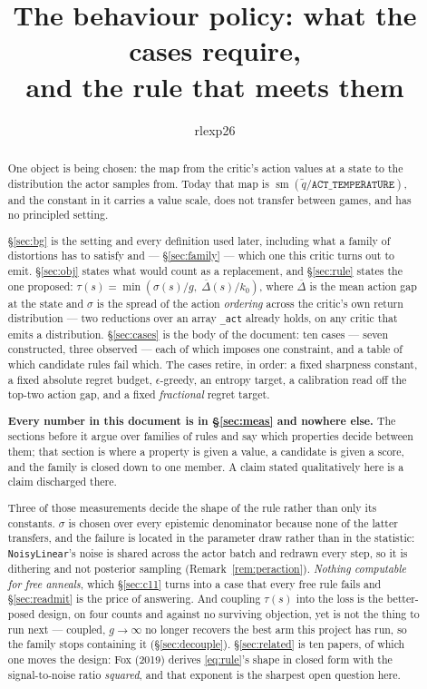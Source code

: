\documentclass{article}
\title{The behaviour policy: what the cases require,\\and the rule that meets them}
\author{rlexp26}
\DeclareMathOperator{\sm}{sm}
\newcommand{\gapbar}{\overline{\Delta}}
\newcommand{\srank}{\sigma}
\begin{document}
\maketitle


\begin{abstract}
One object is being chosen: the map from the critic's action values at a state to the
distribution the actor samples from. Today that map is
$\sm(\tilde{q}/\texttt{ACT\_TEMPERATURE})$, and the constant in it carries a value scale, does
not transfer between games, and has no principled setting.

\S\ref{sec:bg} is the setting and every definition used later, including what a family of
distortions has to satisfy and --- \S\ref{sec:family} --- which one this critic turns out to
emit. \S\ref{sec:obj} states what would count as a replacement, and \S\ref{sec:rule} states the
one proposed: $\tau(s) = \min(\srank(s)/g,\; \gapbar(s)/k_0)$, where $\gapbar$ is the mean action
gap at the state and $\srank$ is the spread of the action \emph{ordering} across the critic's own
return distribution --- two reductions over an array \texttt{\_act} already holds, on any critic
that emits a distribution. \S\ref{sec:cases} is the body of the document: ten cases --- seven
constructed, three observed --- each of which imposes one constraint, and a table of which
candidate rules fail which. The cases retire, in order: a fixed sharpness constant, a fixed
absolute regret budget, $\epsilon$-greedy, an entropy target, a calibration read off the top-two
action gap, and a fixed \emph{fractional} regret target.

\textbf{Every number in this document is in \S\ref{sec:meas} and nowhere else.} The sections
before it argue over families of rules and say which properties decide between them; that section
is where a property is given a value, a candidate is given a score, and the family is closed down
to one member. A claim stated qualitatively here is a claim discharged there.

Three of those measurements decide the shape of the rule rather than only its constants.
$\srank$ is chosen over every epistemic denominator because none of the latter transfers, and the
failure is located in the parameter draw rather than in the statistic: \texttt{NoisyLinear}'s
noise is shared across the actor batch and redrawn every step, so it is dithering and not
posterior sampling (Remark~\ref{rem:peraction}). \emph{Nothing computable for free anneals},
which \S\ref{sec:c11} turns into a case that every free rule fails and \S\ref{sec:readmit} is the
price of answering. And coupling $\tau(s)$ into the loss is the better-posed design, on four
counts and against no surviving objection, yet is not the thing to run next --- coupled,
$g \to \infty$ no longer recovers the best arm this project has run, so the family stops
containing it (\S\ref{sec:decouple}). \S\ref{sec:related} is ten papers, of which one moves the
design: Fox (2019) derives \eqref{eq:rule}'s shape in closed form with the signal-to-noise ratio
\emph{squared}, and that exponent is the sharpest open question here.
\end{abstract}
\end{document}
